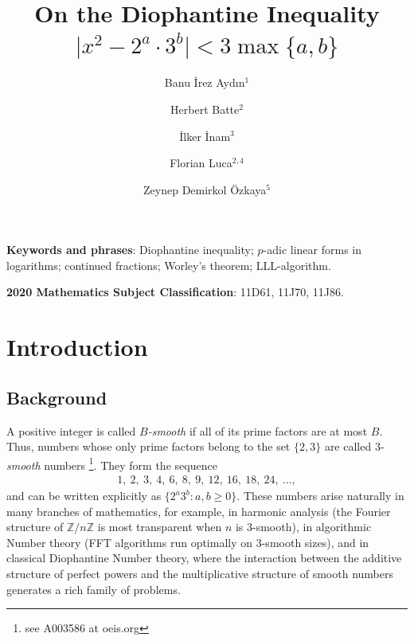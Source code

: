 \documentclass[11pt,a4paper]{article}
\title{On the Diophantine Inequality $\lvert x^{2} - 2^{a}\cdot 3^{b}\rvert < 3\max\{a,b\}$}
\author{Banu \.{I}rez Ayd{\i}n$^{1}$ \and Herbert Batte$^{2}$ \and \.{I}lker \.{I}nam$^{3}$ \and  Florian Luca$^{2,4}$ \and Zeynep Demirkol \"{O}zkaya$^{5}$}
\date{}
\numberwithin{equation}{section}
\numberwithin{table}{section}
\numberwithin{figure}{section}
\begin{document}
\maketitle
{} 

\medskip

{\bf Keywords and phrases}: Diophantine inequality; $p$-adic linear forms in logarithms; continued fractions; Worley's theorem; LLL-algorithm.

\medskip

{\bf 2020 Mathematics Subject Classification}: 11D61, 11J70, 11J86.

\medskip


\section{Introduction}\label{intro}
\subsection{Background}
A positive integer is called \emph{$B$-smooth} if all of its prime factors are at most $B$. Thus, numbers whose only prime factors belong to the set $\{2,3\}$ are called $3$-\emph{smooth} numbers \footnote{see A003586 at oeis.org}. They form the sequence
\begin{align*}
1,\ 2,\ 3,\ 4,\ 6,\ 8,\ 9,\ 12,\ 16,\ 18,\ 24,\ \ldots ,
\end{align*}
and can be written explicitly as $\{2^{a}3^{b} : a,b\geq 0\}$.  These numbers arise naturally in many branches of mathematics, for example, in harmonic analysis (the Fourier structure of $\mathbb{Z}/n\mathbb{Z}$ is most transparent when $n$ is 3-smooth), in algorithmic Number theory (FFT
algorithms run optimally on 3-smooth sizes), and in classical Diophantine Number theory, where the interaction between the additive structure of perfect powers and the multiplicative structure of smooth numbers generates a rich family of problems.
\end{document}
